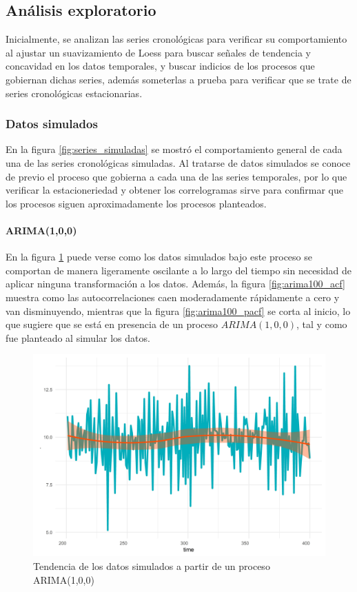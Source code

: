 \documentclass[
]{article}
\begin{document}
\subsection{Análisis exploratorio}

Inicialmente, se analizan las series cronológicas para verificar su
comportamiento al ajustar un suavizamiento de Loess para buscar señales
de tendencia y concavidad en los datos temporales, y buscar indicios de
los procesos que gobiernan dichas series, además someterlas a prueba
para verificar que se trate de series cronológicas estacionarias.

\subsubsection{Datos simulados}

En la figura \ref{fig:series_simuladas} se mostró el comportamiento
general de cada una de las series cronológicas simuladas. Al tratarse de
datos simulados se conoce de previo el proceso que gobierna a cada una
de las series temporales, por lo que verificar la estacioneriedad y
obtener los correlogramas sirve para confirmar que los procesos siguen
aproximadamente los procesos planteados.

\paragraph{ARIMA(1,0,0)}

En la figura \ref{fig:arima100_comportamiento} puede verse como los
datos simulados bajo este proceso se comportan de manera ligeramente
oscilante a lo largo del tiempo sin necesidad de aplicar ninguna
transformación a los datos. Además, la figura \ref{fig:arima100_acf}
muestra como las autocorrelaciones caen moderadamente rápidamente a cero
y van disminuyendo, mientras que la figura \ref{fig:arima100_pacf} se
corta al inicio, lo que sugiere que se está en presencia de un proceso
\(ARIMA(1,0,0)\), tal y como fue planteado al simular los datos.

\begin{figure}[H]
\includegraphics[width=1\linewidth,height=1\textheight]{Tesis_files/figure-latex/arima100_comportamiento-1} \caption{Tendencia de los datos simulados a partir de un proceso ARIMA(1,0,0)}\label{fig:arima100_comportamiento}
\end{figure}
\end{document}
